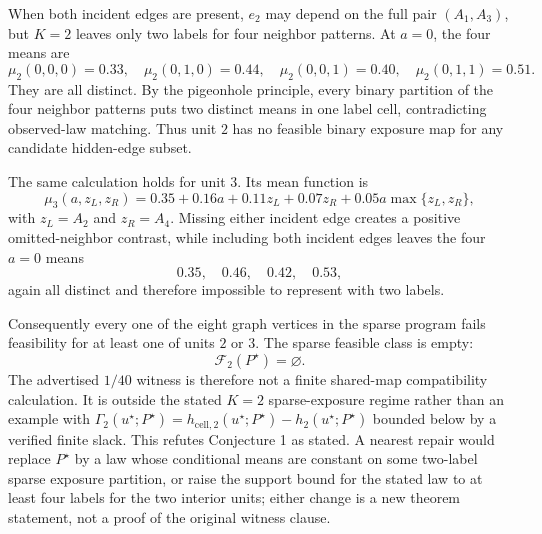 When both incident edges are present, \(e_2\) may depend on the full pair \((A_1,A_3)\), but \(K=2\) leaves only two labels for four neighbor patterns.  At \(a=0\), the four means are
\[
\mu_2(0,0,0)=0.33,\quad
\mu_2(0,1,0)=0.44,\quad
\mu_2(0,0,1)=0.40,\quad
\mu_2(0,1,1)=0.51.
\]
They are all distinct.  By the pigeonhole principle, every binary partition of the four neighbor patterns puts two distinct means in one label cell, contradicting observed-law matching.  Thus unit \(2\) has no feasible binary exposure map for any candidate hidden-edge subset.

The same calculation holds for unit \(3\).  Its mean function is
\[
\mu_3(a,z_L,z_R)=0.35+0.16a+0.11z_L+0.07z_R+0.05a\max\{z_L,z_R\},
\]
with \(z_L=A_2\) and \(z_R=A_4\).  Missing either incident edge creates a positive omitted-neighbor contrast, while including both incident edges leaves the four \(a=0\) means
\[
0.35,\quad 0.46,\quad 0.42,\quad 0.53,
\]
again all distinct and therefore impossible to represent with two labels.

Consequently every one of the eight graph vertices in the sparse program fails feasibility for at least one of units \(2\) or \(3\).  The sparse feasible class is empty:
\[
\mathcal F_2(P^\star)=\varnothing.
\]
The advertised \(1/40\) witness is therefore not a finite shared-map compatibility calculation.  It is outside the stated \(K=2\) sparse-exposure regime rather than an example with
\(\Gamma_2(u^\star;P^\star)=h_{\mathrm{cell},2}(u^\star;P^\star)-h_2(u^\star;P^\star)\) bounded below by a verified finite slack.  This refutes Conjecture 1 as stated.  A nearest repair would replace \(P^\star\) by a law whose conditional means are constant on some two-label sparse exposure partition, or raise the support bound for the stated law to at least four labels for the two interior units; either change is a new theorem statement, not a proof of the original witness clause.
